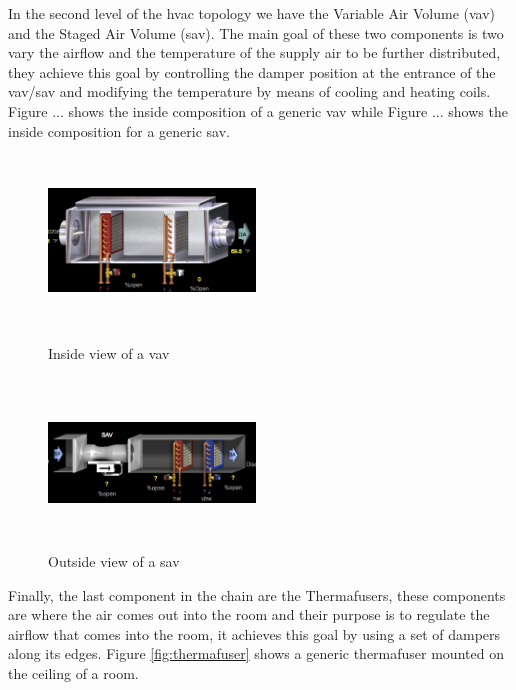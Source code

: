 In the second level of the \gls{hvac} topology we have the Variable Air Volume (\gls{vav}) and the Staged Air Volume (\gls{sav}). The main goal of these two components is two vary the airflow and the temperature of the supply air to be further distributed, they achieve this goal by controlling the damper position at the entrance of the \gls{vav}/\gls{sav} and modifying the temperature by means of cooling and heating coils. Figure ... shows the inside composition of a generic \gls{vav} while Figure ... shows the inside composition for a generic \gls{sav}.

\begin{figure}[H]
	\centering
		\begin{minipage}{.5\textwidth}
 			 \centering
  			\includegraphics[width=55mm, height=45mm]{resources/VAVInside.png}
  			\caption{Inside view of a \gls{vav}}
 			 \label{fig:vav_inside}
		\end{minipage}%
		\begin{minipage}{.5\textwidth}
  			\centering
  			\includegraphics[width=55mm, height=45mm]{resources/SAVInside.png}
  			\caption{Outside view of a \gls{sav}}
  			\label{fig:sav_inside}
		\end{minipage}
\end{figure}

Finally, the last component in the chain are the Thermafusers, these components are where the air comes out into the room and their purpose is to regulate the airflow that comes into the room, it achieves this goal by using a set of dampers along its edges. Figure \ref{fig:thermafuser} shows a generic thermafuser mounted on the ceiling of a room.

